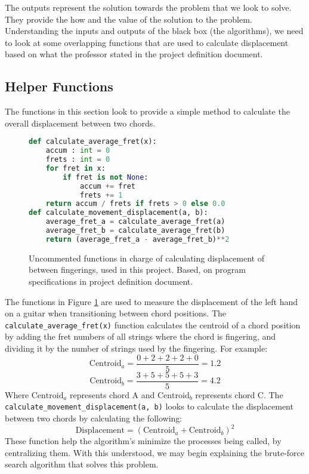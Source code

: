 \documentclass[conference]{IEEEtran}
\begin{document}
\indent The outputs represent the solution towards the problem that we look to solve. They provide the how and the value of the solution to the problem.
\newline
\indent Understanding the inputs and outputs of the black box (the algorithms), we need to look at some overlapping functions that are used to calculate displacement based on what the professor stated in the project definition document.
\subsection{Helper Functions}
The functions in this section look to provide a simple method to calculate the overall displacement between two chords. 
\begin{figure}[H]
\begin{lstlisting}[language=Python]
def calculate_average_fret(x):
    accum : int = 0
    frets : int = 0
    for fret in x:
        if fret is not None:
            accum += fret
            frets += 1
    return accum / frets if frets > 0 else 0.0
def calculate_movement_displacement(a, b):
    average_fret_a = calculate_average_fret(a)
    average_fret_b = calculate_average_fret(b)
    return (average_fret_a - average_fret_b)**2    
\end{lstlisting}
\caption{Uncommented functions in charge of calculating displacement of between fingerings, used in this project. Based, on program specifications in project definition document.}
\label{fig:DisplacementFunctions}
\end{figure}
The functions in Figure \ref{fig:DisplacementFunctions} are used to measure the displacement of the left hand on a guitar when transitioning between chord positions. The \lstinline|calculate_average_fret(x)| function calculates the centroid of a chord position by adding the fret numbers of all strings where the chord is fingering, and dividing it by the number of strings used by the fingering. For example: 
\[ \text{Centroid}_a  = \frac{0+2+2+2+0}{5} = 1.2 \] 
\[ \text{Centroid}_b = \frac{3+5+5+5+3}{5} = 4.2 \]
\indent Where \( \text{Centroid}_a \) represents chord A and \(\text{Centroid}_b \) represents chord C. 
\newline 
\indent The \lstinline|calculate_movement_displacement(a, b)| looks to calculate the displacement between two chords by calculating the following:
\[
\text{Displacement} = (\text{Centroid}_a + \text{Centroid}_b)^2
\]
\indent These function help the algorithm's minimize the processes being called, by centralizing them. With this understood, we may begin explaining the brute-force search algorithm that solves this problem.
\end{document}
